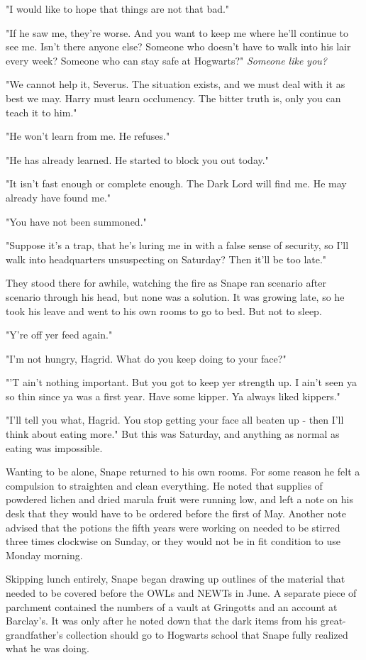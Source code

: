"I would like to hope that things are not that bad."

"If he saw me, they're worse. And you want to keep me where he'll continue to see me. Isn't there anyone else? Someone who doesn't have to walk into his lair every week? Someone who can stay safe at Hogwarts?" \emph{Someone like you?}

"We cannot help it, Severus. The situation exists, and we must deal with it as best we may. Harry must learn occlumency. The bitter truth is, only you can teach it to him."

"He won't learn from me. He refuses."

"He has already learned. He started to block you out today."

"It isn't fast enough or complete enough. The Dark Lord will find me. He may already have found me."

"You have not been summoned."

"Suppose it's a trap, that he's luring me in with a false sense of security, so I'll walk into headquarters unsuspecting on Saturday? Then it'll be too late."

They stood there for awhile, watching the fire as Snape ran scenario after scenario through his head, but none was a solution. It was growing late, so he took his leave and went to his own rooms to go to bed. But not to sleep.

"Y're off yer feed again."

"I'm not hungry, Hagrid. What do you keep doing to your face?"

"'T ain't nothing important. But you got to keep yer strength up. I ain't seen ya so thin since ya was a first year. Have some kipper. Ya always liked kippers."

"I'll tell you what, Hagrid. You stop getting your face all beaten up - then I'll think about eating more." But this was Saturday, and anything as normal as eating was impossible.

Wanting to be alone, Snape returned to his own rooms. For some reason he felt a compulsion to straighten and clean everything. He noted that supplies of powdered lichen and dried marula fruit were running low, and left a note on his desk that they would have to be ordered before the first of May. Another note advised that the potions the fifth years were working on needed to be stirred three times clockwise on Sunday, or they would not be in fit condition to use Monday morning.

Skipping lunch entirely, Snape began drawing up outlines of the material that needed to be covered before the OWLs and NEWTs in June. A separate piece of parchment contained the numbers of a vault at Gringotts and an account at Barclay's. It was only after he noted down that the dark items from his great-grandfather's collection should go to Hogwarts school that Snape fully realized what he was doing.

